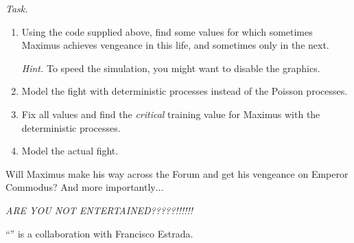 \hfill

\emph{Task. } 
\begin{enumerate}[label=\emph{\arabic*.}]
	\item Using the code supplied above, find some values for which sometimes Maximus achieves vengeance in this life, and sometimes only in the next.
	
	\emph{Hint.} To speed the simulation, you might want to disable the graphics.
	\item Model the fight with deterministic processes instead of the Poisson processes.
	\item Fix all values and find the \emph{critical} training value for Maximus with the deterministic processes.
	\item Model the actual fight.
\end{enumerate}











\vfill

Will Maximus make his way across the Forum and get his vengeance on Emperor Commodus? And more importantly$\ldots$

\begin{center}
\emph{ARE YOU NOT ENTERTAINED?????!!!!!!	}
\end{center}

%
%


\vfill

\begin{graybox}
\hfill ``\maximustitle'' is a collaboration with Francisco Estrada.
\end{graybox}

\begin{noexercises}
\end{noexercises}
